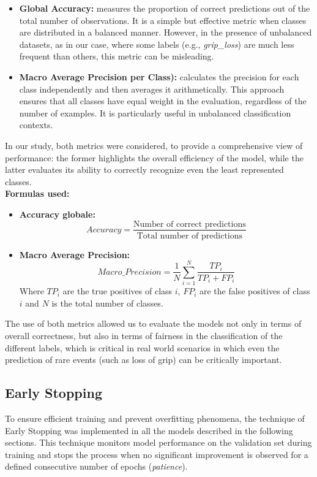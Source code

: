 \documentclass[a4paper,final,12pt]{report}
\begin{document}
\begin{itemize}
    \item \textbf{Global Accuracy:} measures the proportion of correct predictions out of the total number of observations. It is a simple but effective metric when classes are distributed in a balanced manner. However, in the presence of unbalanced datasets, as in our case, where some labels (e.g., \textit{grip\_loss}) are much less frequent than others, this metric can be misleading.

    \item \textbf{Macro Average Precision per Class):} calculates the precision for each class independently and then averages it arithmetically. This approach ensures that all classes have equal weight in the evaluation, regardless of the number of examples. It is particularly useful in unbalanced classification contexts.
\end{itemize}
In our study, both metrics were considered, to provide a comprehensive view of performance: the former highlights the overall efficiency of the model, while the latter evaluates its ability to correctly recognize even the least represented classes.\\

\textbf{Formulas used:}

\begin{itemize}
    \item \textbf{Accuracy globale:}
    \[
        Accuracy = \frac{\text{Number of correct predictions}}{\text{Total number of predictions}}
    \]

    \item \textbf{Macro Average Precision:}
    \[
        Macro\_Precision = \frac{1}{N} \sum_{i=1}^{N} \frac{TP_i}{TP_i + FP_i}
    \]
    Where $TP_i$ are the true positives of class $i$, $FP_i$ are the false positives of class $i$ and $N$ is the total number of classes.
\end{itemize}
The use of both metrics allowed us to evaluate the models not only in terms of overall correctness, but also in terms of fairness in the classification of the different labels, which is critical in real world scenarios in which even the prediction of rare events (such as loss of grip) can be critically important.

\subsection{Early Stopping}
To ensure efficient training and prevent overfitting phenomena, the technique of Early Stopping was implemented in all the models described in the following sections. This technique monitors model performance on the validation set during training and stops the process when no significant improvement is observed for a defined consecutive number of epochs (\textit{patience}).\\
\end{document}
